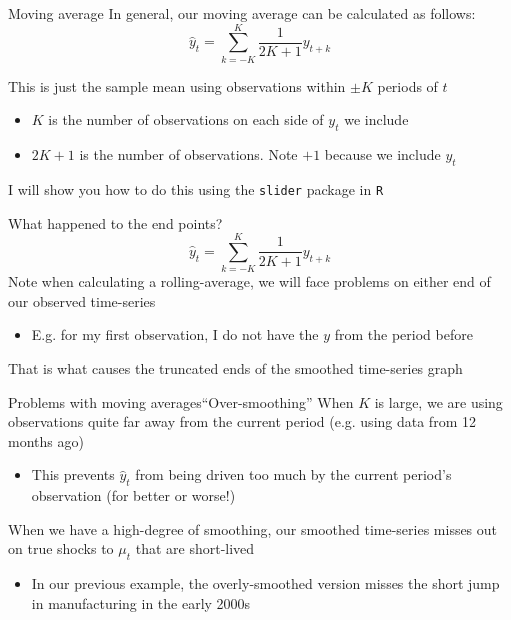 \documentclass[aspectratio=169,t,11pt,table]{beamer}
\begin{document}

\begin{frame}{Moving average}
  In general, our moving average can be calculated as follows:
  $$
    \hat{y}_t = \sum_{k=-K}^K \frac{1}{2K+1} y_{t + k}
  $$

  \bigskip
  This is just the sample mean using observations within $\pm K$ periods of $t$
  \begin{itemize}
    \item $K$ is the number of observations on each side of $y_t$ we include
    \item $2K+1$ is the number of observations. Note $+1$ because we include $y_t$
  \end{itemize}
  
  \pause
  \bigskip
  I will show you how to do this using the \texttt{slider} package in \texttt{R}
\end{frame}

\begin{frame}{What happened to the end points?}
  $$
    \hat{y}_t = \sum_{k=-K}^K \frac{1}{2K+1} y_{t + k}
  $$
  Note when calculating a rolling-average, we will face problems on either end of our observed time-series
  \begin{itemize}
    \item E.g. for my first observation, I do not have the $y$ from the period before
  \end{itemize}

  \pause
  \bigskip
  That is what causes the truncated ends of the smoothed time-series graph
\end{frame}


\begin{frame}{Problems with moving averages}{``Over-smoothing''}
  When $K$ is large, we are using observations quite far away from the current period (e.g. using data from 12 months ago)
  \begin{itemize}
    \item This prevents $\hat{y}_t$ from being driven too much by the current period's observation (for better or worse!)
  \end{itemize}

  \pause
  \bigskip
  When we have a high-degree of smoothing, our smoothed time-series misses out on true shocks to $\mu_t$ that are short-lived 
  \begin{itemize}
    \item In our previous example, the overly-smoothed version misses the short jump in manufacturing in the early 2000s
  \end{itemize}
\end{frame}
\end{document}
